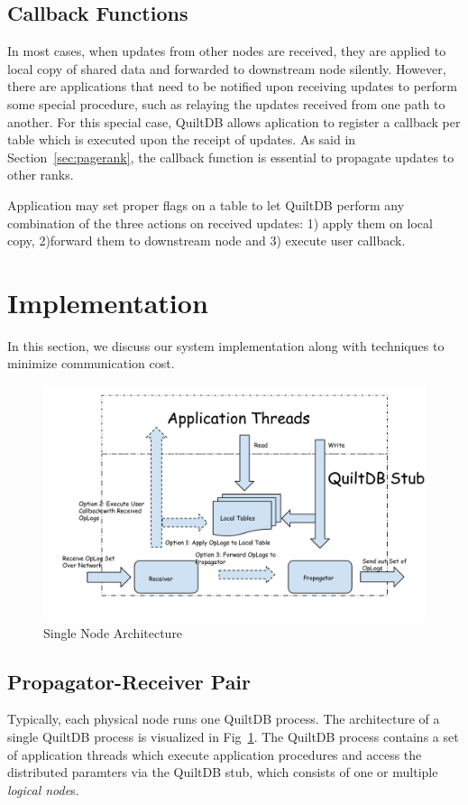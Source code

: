 \documentclass[11pt, twocolumn]{article}
\begin{document}
\subsection{Callback Functions}
\label{sec:callback}

In most cases, when updates from other nodes are received, they are applied to
local copy of shared data and forwarded to downstream node silently.
However, there are applications that need to be notified upon receiving updates
to perform some special procedure, such as relaying the updates received from
one path to another. For this special case, QuiltDB allows aplication to
register a callback per table which is executed upon the receipt of updates. As
said in Section~\ref{sec:pagerank}, the callback function is essential to
propagate updates to other ranks.

Application may set proper flags on a table to let QuiltDB perform any
combination of the three actions on received updates: 1) apply them on local
copy, 2)forward them to downstream node and 3) execute user callback.

\section{Implementation}
In this section, we discuss our system implementation along with techniques to
minimize communication cost.

\begin{figure}[th!]
  \centering
  \includegraphics[width=.7\textwidth]{fig/propagator-receiver.pdf}
  \caption{Single Node Architecture}
  \label{fig:prop-recv}
\end{figure}

\subsection{Propagator-Receiver Pair}

Typically, each physical node runs one QuiltDB process. The architecture of a single
QuiltDB process is visualized in Fig~\ref{fig:prop-recv}.  The QuiltDB process
contains a set of application threads which execute application procedures and
access the distributed paramters via the QuiltDB stub, which consists of one
or multiple \emph{logical node}s.
\end{document}
